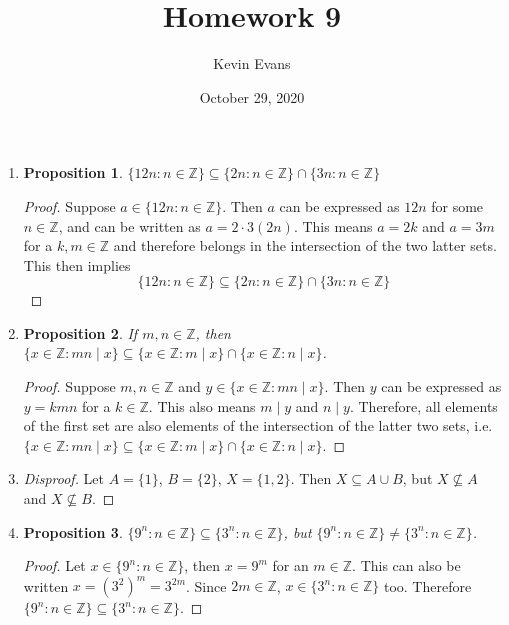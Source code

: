 \documentclass{homework}
\title{Homework 9}
\author{Kevin Evans}
\date{October 29, 2020}
\newtheorem*{prop}{Proposition}
\begin{document}
	\maketitle
	
	\begin{enumerate}
		\item \begin{minipage}[t]{\linewidth}
			\begin{prop}
				$\{ 12n : n \in \mathbb{Z} \} \subseteq \{2n : n \in \mathbb{Z}\} \cap \{3n : n \in \mathbb{Z}\}$
			\end{prop}
			\begin{proof}
				Suppose $a \in \{ 12n : n \in \mathbb{Z}\}$. Then $a$ can be expressed as $12n$ for some $n \in \mathbb{Z}$, and can be written as $a=2 \cdot 3 (2n)$. This means $a = 2k$ and $a=3m$ for a $k, m \in \mathbb{Z}$ and therefore belongs in the intersection of the two latter sets. This then implies
				$$\{ 12n : n \in \mathbb{Z} \} \subseteq \{2n : n \in \mathbb{Z}\} \cap \{3n : n \in \mathbb{Z}\}$$
			\end{proof}
		\end{minipage}
	
		\item  \begin{minipage}[t]{\linewidth}
			\begin{prop}
				If $m, n \in \mathbb{Z}$, then $\{ x \in \mathbb{Z} : mn \mid x\} \subseteq \{x \in \mathbb{Z} : m \mid x\} \cap \{x \in \mathbb{Z} : n \mid x\}$.
			\end{prop}
			\begin{proof} Suppose $m, n \in \mathbb{Z}$ and $y \in \{x \in \mathbb{Z} : mn \mid x\}$. Then $y$ can be expressed as $y = kmn$ for a $k \in \mathbb{Z}$. This also means $m \mid y$ and $n \mid y$. Therefore, all elements of the first set are also elements of the intersection of the latter two sets, i.e. $\{ x \in \mathbb{Z} : mn \mid x\} \subseteq \{x \in \mathbb{Z} : m \mid x\} \cap \{x \in \mathbb{Z} : n \mid x\}$.
			\end{proof}
		\end{minipage}
	
		\item \begin{proof}[Disproof]
			Let $A = \{ 1 \}$, $B=\{2 \}$, $X=\{1, 2\}$. Then $X \subseteq A \cup B$, but $X \nsubseteq A$ and $X \nsubseteq B$.
		\end{proof}
	
		\item \begin{minipage}[t]{\linewidth}
			\begin{prop}
				$\{ 9^n : n \in \mathbb{Z}\} \subseteq \{3^n : n \in \mathbb{Z}\}$, but $\{9^n : n \in \mathbb{Z}\} \ne \{3^n : n \in \mathbb{Z}\}$.
			\end{prop}
			\begin{proof} Let $x \in \{ 9^n : n \in \mathbb{Z}\}$, then $x = 9^m$ for an $m \in \mathbb{Z}$. This can also be written $x = (3^2)^m = 3^{2m}$. Since $2m \in \mathbb{Z}$, $x \in \{3^n : n \in \mathbb{Z}\}$ too. Therefore $\{ 9^n : n \in \mathbb{Z}\} \subseteq \{3^n : n \in \mathbb{Z}\}$.
				

\end{proof}
\end{minipage}
\end{enumerate}
\end{document}
